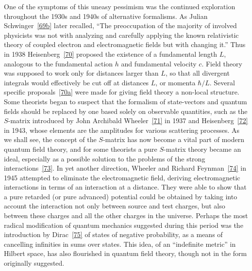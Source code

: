 One of the symptoms of this uneasy pessimism was the continued exploration throughout the 1930s and 1940s of alternative formalisms. As Julian Schwinger~\hyperref[ref:1.69b]{[69b]} later recalled, ``The preoccupation of the majority of involved physicists was not with analyzing and carefully applying the known relativistic theory of coupled electron and electromagnetic fields but with changing it.'' Thus in 1938 Heisenberg~\hyperref[ref:1.70]{[70]} proposed the existence of a fundamental length $L$, analogous to the fundamental action $h$ and fundamental velocity $c$. Field theory was supposed to work only for distances larger than $L$, so that all divergent integrals would effectively be cut off at distances $L$, or momenta $\hbar/L$. Several specific proposals~\hyperref[ref:1.70a]{[70a]} were made for giving field theory a non-local structure. Some theorists began to suspect that the formalism of state-vectors and quantum fields should be replaced by one based solely on observable quantities, such as the $S$-matrix introduced by John Archibald Wheeler~\hyperref[ref:1.71]{[71]} in 1937 and Heisenberg~\hyperref[ref:1.72]{[72]} in 1943, whose elements are the amplitudes for various scattering processes. As we shall see, the concept of the $S$-matrix has now become a vital part of modern quantum field theory, and for some theorists a pure $S$-matrix theory became an ideal, especially as a possible solution to the problems of the strong interactions~\hyperref[ref:1.73]{[73]}. In yet another direction, Wheeler and Richard Feynman~\hyperref[ref:1.74]{[74]} in 1945 attempted to eliminate the electromagnetic field, deriving electromagnetic interactions in terms of an interaction at a distance. They were able to show that a pure retarded (or pure advanced) potential could be obtained by taking into account the interaction not only between source and test charges, but also between these charges and all the other charges in the universe. Perhaps the most radical modification of quantum mechanics suggested during this period was the introduction by Dirac~\hyperref[ref:1.75]{[75]} of states of negative probability, as a means of cancelling infinities in sums over states. This idea, of an ``indefinite metric'' in Hilbert space, has also flourished in quantum field theory, though not in the form originally suggested.

